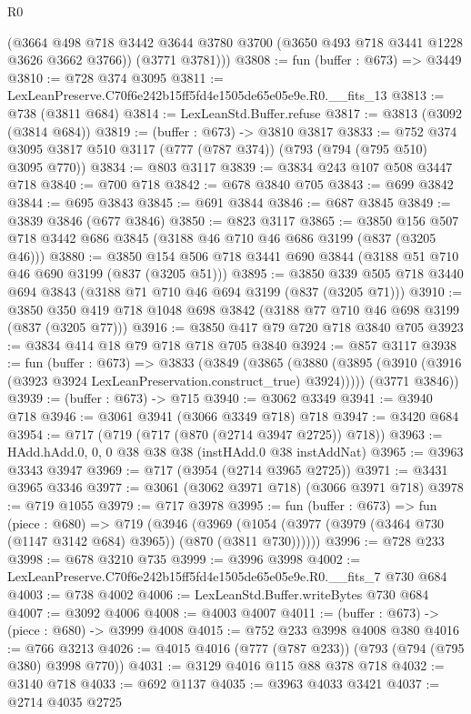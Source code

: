 \begin{lexlean}{R0}
\begin{coremodule}
        (@3664 @498 @718 @3442 @3644 @3780 @3700 (@3650 @493 @718 @3441 @1228 @3626 @3662 @3766))
        (@3771 @3781)))
@3808 := fun (buffer : @673) => @3449
@3810 := @728 @374 @3095
@3811 := LexLeanPreserve.C70f6e242b15ff5fd4e1505de65e05e9e.R0.__fits_13
@3813 := @738 (@3811 @684)
@3814 := LexLeanStd.Buffer.refuse
@3817 := @3813 (@3092 (@3814 @684))
@3819 := (buffer : @673) -> @3810 @3817
@3833 := @752 @374 @3095 @3817 @510 @3117 (@777 (@787 @374)) (@793 (@794 (@795 @510) @3095 @770))
@3834 := @803 @3117
@3839 := @3834 @243 @107 @508 @3447 @718
@3840 := @700 @718
@3842 := @678 @3840 @705
@3843 := @699 @3842
@3844 := @695 @3843
@3845 := @691 @3844
@3846 := @687 @3845
@3849 := @3839 @3846 (@677 @3846)
@3850 := @823 @3117
@3865 := @3850 @156 @507 @718 @3442 @686 @3845 (@3188 @46 @710 @46 @686 @3199 (@837 (@3205 @46)))
@3880 := @3850 @154 @506 @718 @3441 @690 @3844 (@3188 @51 @710 @46 @690 @3199 (@837 (@3205 @51)))
@3895 := @3850 @339 @505 @718 @3440 @694 @3843 (@3188 @71 @710 @46 @694 @3199 (@837 (@3205 @71)))
@3910 := @3850 @350 @419 @718 @1048 @698 @3842 (@3188 @77 @710 @46 @698 @3199 (@837 (@3205 @77)))
@3916 := @3850 @417 @79 @720 @718 @3840 @705
@3923 := @3834 @414 @18 @79 @718 @718 @705 @3840
@3924 := @857 @3117
@3938 := fun (buffer : @673) =>
  @3833
    (@3849
      (@3865 (@3880 (@3895 (@3910 (@3916 (@3923 @3924 LexLeanPreservation.construct_true) @3924)))))
      (@3771 @3846))
@3939 := (buffer : @673) -> @715
@3940 := @3062 @3349
@3941 := @3940 @718
@3946 := @3061 @3941 (@3066 @3349 @718) @718
@3947 := @3420 @684
@3954 := @717 (@719 (@717 (@870 (@2714 @3947 @2725)) @718))
@3963 := HAdd.hAdd.{0, 0, 0} @38 @38 @38 (instHAdd.{0} @38 instAddNat)
@3965 := @3963 @3343 @3947
@3969 := @717 (@3954 (@2714 @3965 @2725))
@3971 := @3431 @3965 @3346
@3977 := @3061 (@3062 @3971 @718) (@3066 @3971 @718)
@3978 := @719 @1055
@3979 := @717 @3978
@3995 := fun (buffer : @673) =>
  fun (piece : @680) =>
  @719
    (@3946
      (@3969 (@1054 (@3977 (@3979 (@3464 @730 (@1147 @3142 @684) @3965)) (@870 (@3811 @730))))))
@3996 := @728 @233
@3998 := @678 @3210 @735
@3999 := @3996 @3998
@4002 := LexLeanPreserve.C70f6e242b15ff5fd4e1505de65e05e9e.R0.__fits_7 @730 @684
@4003 := @738 @4002
@4006 := LexLeanStd.Buffer.writeBytes @730 @684
@4007 := @3092 @4006
@4008 := @4003 @4007
@4011 := (buffer : @673) -> (piece : @680) -> @3999 @4008
@4015 := @752 @233 @3998 @4008 @380
@4016 := @766 @3213
@4026 := @4015 @4016 (@777 (@787 @233)) (@793 (@794 (@795 @380) @3998 @770))
@4031 := @3129 @4016 @115 @88 @378 @718
@4032 := @3140 @718
@4033 := @692 @1137
@4035 := @3963 @4033 @3421
@4037 := @2714 @4035 @2725

\end{coremodule}
\end{lexlean}
